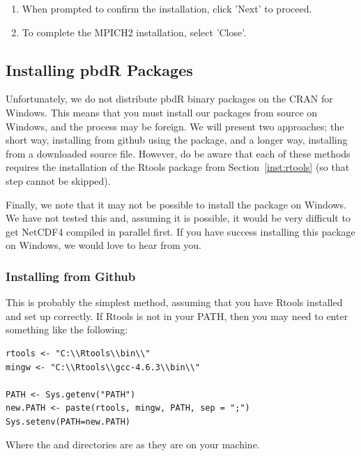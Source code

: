 \begin{enumerate}
  \item When prompted to confirm the installation, click 'Next' to proceed.
  \item To complete the MPICH2 installation, select 'Close'.
\end{enumerate}






\subsection{Installing pbdR Packages}

Unfortunately, we do not distribute pbdR binary packages on the CRAN for Windows.  This means that you must install our packages from source on Windows, and the process may be foreign.  We will present two approaches; the short way, installing from github using the  package, and a longer way, installing from a downloaded source file.  However, do be aware that each of these methods requires the installation of the Rtools package from Section~\ref{inst:rtools} (so that step cannot be skipped).

Finally, we note that it may not be possible to install the  package on Windows.  We have not tested this and, assuming it is possible, it would be very difficult to get NetCDF4 compiled in parallel first.  If you have success installing this package on Windows, we would love to hear from you.


\subsubsection{Installing from Github}

This is probably the simplest method, assuming that you have Rtools installed and set up correctly.  If Rtools is not in your PATH, then you may need to enter something like the following:
\begin{lstlisting}[language=rr]
rtools <- "C:\\Rtools\\bin\\"
mingw <- "C:\\Rtools\\gcc-4.6.3\\bin\\"

PATH <- Sys.getenv("PATH")
new.PATH <- paste(rtools, mingw, PATH, sep = ";")
Sys.setenv(PATH=new.PATH)
\end{lstlisting}
Where the  and  directories are as they are on your machine.

